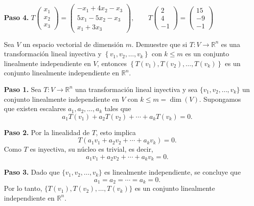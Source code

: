 \begin{prob}
\begin{myproof}
\textbf{Paso 4.} $\boxed{T\begin{pmatrix} x_1 \\ x_2 \\ x_3 \end{pmatrix} = \begin{pmatrix} -x_1 + 4x_2 - x_3 \\ 5x_1 - 5x_2 - x_3 \\ x_1 + 3x_3 \end{pmatrix}, \qquad T\begin{pmatrix} 2 \\ 4 \\ -1 \end{pmatrix} = \begin{pmatrix} 15 \\ -9 \\ -1 \end{pmatrix}}$
\end{myproof}
\end{prob}


\begin{prob}
Sea $V$ un espacio vectorial de dimensión $m$. Demuestre que si $T:V\rightarrow \mathbb{R}^n$ es una transformación lineal inyectiva y $\left\lbrace v_1,v_2,\dots , v_k \right\rbrace$ con $k\leq m$ es un conjunto linealmente independiente en $V$, entonces $\left\lbrace T(v_1), T(v_2), \dots , T(v_k)  \right\rbrace$ es un conjunto linealmente independiente en $\mathbb{R}^n$.
\begin{myproof}
\textbf{Paso 1.} Sea $T: V \to \mathbb{R}^n$ una transformación lineal inyectiva y sea $\{v_1, v_2, \dots, v_k\}$ un conjunto linealmente independiente en $V$ con $k \leq m = \dim(V)$. Supongamos que existen escalares $a_1, a_2, \dots, a_k$ tales que
\[
    a_1 T(v_1) + a_2 T(v_2) + \cdots + a_k T(v_k) = 0.
\]

\textbf{Paso 2.} Por la linealidad de $T$, esto implica
\[
    T(a_1 v_1 + a_2 v_2 + \cdots + a_k v_k) = 0.
\]
Como $T$ es inyectiva, su núcleo es trivial, es decir,
\[
    a_1 v_1 + a_2 v_2 + \cdots + a_k v_k = 0.
\]

\textbf{Paso 3.} Dado que $\{v_1, v_2, \dots, v_k\}$ es linealmente independiente, se concluye que
\[
    a_1 = a_2 = \cdots = a_k = 0.
\]
Por lo tanto, $\{T(v_1), T(v_2), \dots, T(v_k)\}$ es un conjunto linealmente independiente en $\mathbb{R}^n$.
\end{myproof}
\end{prob}

